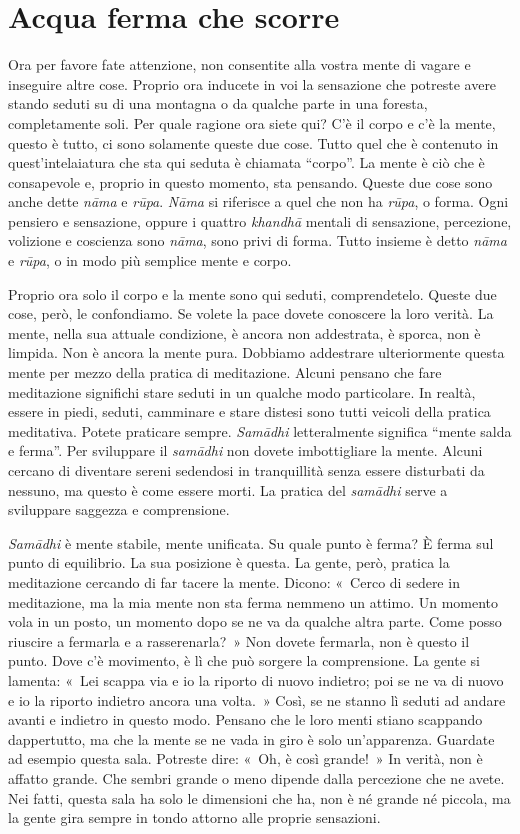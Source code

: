 \chapter{Acqua ferma che scorre}

Ora per favore fate attenzione, non consentite alla vostra mente di
vagare e inseguire altre cose. Proprio ora inducete in voi la sensazione
che potreste avere stando seduti su di una montagna o da qualche parte
in una foresta, completamente soli. Per quale ragione ora siete qui? C'è
il corpo e c'è la mente, questo è tutto, ci sono solamente queste due
cose. Tutto quel che è contenuto in quest'intelaiatura che sta qui
seduta è chiamata ``corpo''. La mente è ciò che è consapevole e, proprio
in questo momento, sta pensando. Queste due cose sono anche dette
\emph{nāma} e \emph{rūpa}. \emph{Nāma} si riferisce a quel che non ha
\emph{rūpa}, o forma. Ogni pensiero e sensazione, oppure i quattro
\emph{khandhā} mentali di sensazione, percezione, volizione e coscienza
sono \emph{nāma}, sono privi di forma. Tutto insieme è detto \emph{nāma}
e \emph{rūpa}, o in modo più semplice mente e corpo.

Proprio ora solo il corpo e la mente sono qui seduti, comprendetelo.
Queste due cose, però, le confondiamo. Se volete la pace dovete
conoscere la loro verità. La mente, nella sua attuale condizione, è
ancora non addestrata, è sporca, non è limpida. Non è ancora la mente
pura. Dobbiamo addestrare ulteriormente questa mente per mezzo della
pratica di meditazione. Alcuni pensano che fare meditazione significhi
stare seduti in un qualche modo particolare. In realtà, essere in piedi,
seduti, camminare e stare distesi sono tutti veicoli della pratica
meditativa. Potete praticare sempre. \emph{Samādhi} letteralmente
significa ``mente salda e ferma''. Per sviluppare il \emph{samādhi} non
dovete imbottigliare la mente. Alcuni cercano di diventare sereni
sedendosi in tranquillità senza essere disturbati da nessuno, ma questo
è come essere morti. La pratica del \emph{samādhi} serve a sviluppare
saggezza e comprensione.

\emph{Samādhi} è mente stabile, mente unificata. Su quale punto è ferma?
È ferma sul punto di equilibrio. La sua posizione è questa. La gente,
però, pratica la meditazione cercando di far tacere la mente. Dicono:
«~Cerco di sedere in meditazione, ma la mia mente non sta ferma nemmeno
un attimo. Un momento vola in un posto, un momento dopo se ne va da
qualche altra parte. Come posso riuscire a fermarla e a rasserenarla?~»
Non dovete fermarla, non è questo il punto. Dove c'è movimento, è lì che
può sorgere la comprensione. La gente si lamenta: «~Lei scappa via e io
la riporto di nuovo indietro; poi se ne va di nuovo e io la riporto
indietro ancora una volta.~» Così, se ne stanno lì seduti ad andare
avanti e indietro in questo modo. Pensano che le loro menti stiano
scappando dappertutto, ma che la mente se ne vada in giro è solo
un'apparenza. Guardate ad esempio questa sala. Potreste dire: «~Oh, è
così grande!~» In verità, non è affatto grande. Che sembri grande o meno
dipende dalla percezione che ne avete. Nei fatti, questa sala ha solo le
dimensioni che ha, non è né grande né piccola, ma la gente gira sempre
in tondo attorno alle proprie sensazioni.

